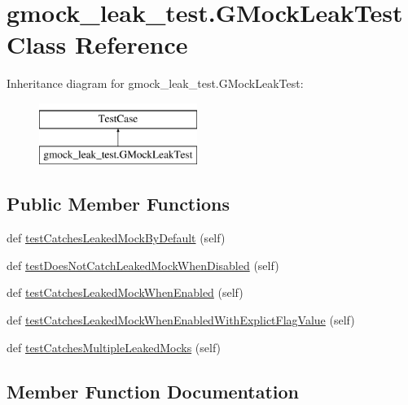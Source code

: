 \hypertarget{classgmock__leak__test_1_1GMockLeakTest}{}\section{gmock\+\_\+leak\+\_\+test.\+G\+Mock\+Leak\+Test Class Reference}
\label{classgmock__leak__test_1_1GMockLeakTest}
Inheritance diagram for gmock\+\_\+leak\+\_\+test.\+G\+Mock\+Leak\+Test\+:\begin{figure}[H]
\begin{center}
\leavevmode
\includegraphics[height=2.000000cm]{classgmock__leak__test_1_1GMockLeakTest}
\end{center}
\end{figure}
\subsection*{Public Member Functions}
\begin{DoxyCompactItemize}
\item 
def \mbox{\hyperlink{classgmock__leak__test_1_1GMockLeakTest_ad87d271de7b3f106e51272d6e9139c76}{test\+Catches\+Leaked\+Mock\+By\+Default}} (self)
\item 
def \mbox{\hyperlink{classgmock__leak__test_1_1GMockLeakTest_a3107bf5a603558ab2d97d88fb5589951}{test\+Does\+Not\+Catch\+Leaked\+Mock\+When\+Disabled}} (self)
\item 
def \mbox{\hyperlink{classgmock__leak__test_1_1GMockLeakTest_a78f4040a392d183597f71d92da8c1246}{test\+Catches\+Leaked\+Mock\+When\+Enabled}} (self)
\item 
def \mbox{\hyperlink{classgmock__leak__test_1_1GMockLeakTest_ab19cf302ea06e1b186bd6ab951d9161e}{test\+Catches\+Leaked\+Mock\+When\+Enabled\+With\+Explict\+Flag\+Value}} (self)
\item 
def \mbox{\hyperlink{classgmock__leak__test_1_1GMockLeakTest_a09465b2bfde98834e4bb9563c035f034}{test\+Catches\+Multiple\+Leaked\+Mocks}} (self)
\end{DoxyCompactItemize}


\subsection{Member Function Documentation}
\mbox{\label{classgmock__leak__test_1_1GMockLeakTest_ad87d271de7b3f106e51272d6e9139c76}} 
